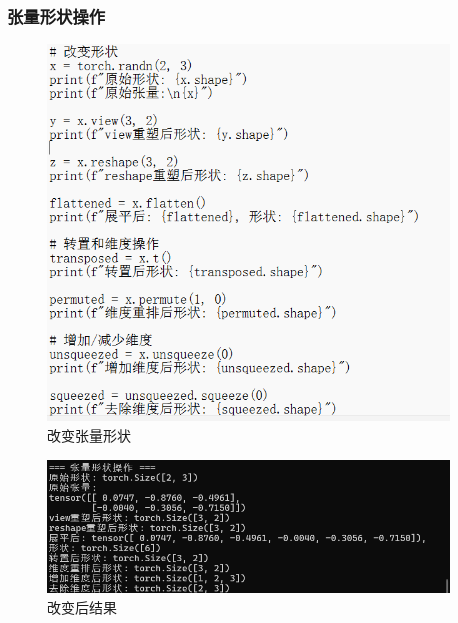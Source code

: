 \documentclass[UTF8]{ctexart}
\begin{document}
\subsubsection{张量形状操作}

\begin{figure}[H]
    \centering
    \includegraphics[width=0.95\textwidth]{picture/改变张量形状.png}%
    \caption{改变张量形状}
\end{figure}


\begin{figure}[H]
    \centering
    \includegraphics[width=0.95\textwidth]{picture/张量形状改变结果.png}%
    \caption{改变后结果}
\end{figure}
\end{document}
